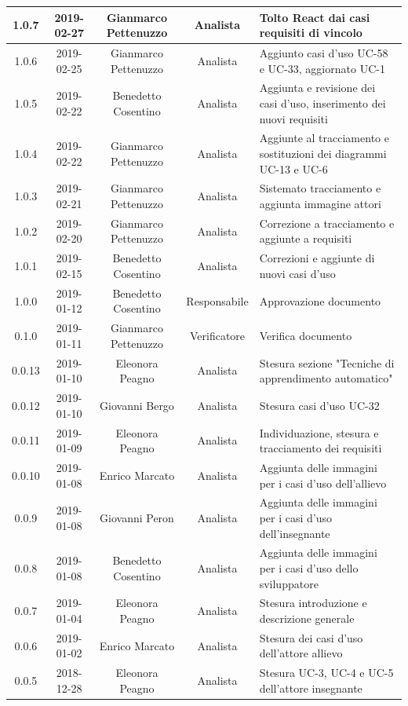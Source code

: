 \documentclass[11pt,a4paper]{article}
\begin{document}
{\begin{tabularx}{\textwidth}{ c | c | c | c | X }
		1.0.7 & 2019-02-27 & Gianmarco Pettenuzzo & Analista & Tolto React dai casi requisiti di vincolo\\ \hline
		1.0.6 & 2019-02-25 & Gianmarco Pettenuzzo & Analista & Aggiunto casi d'uso UC-58 e UC-33, aggiornato UC-1\\ \hline
		1.0.5 & 2019-02-22 & Benedetto Cosentino & Analista & Aggiunta e revisione dei casi d'uso, inserimento dei nuovi requisiti\\ \hline
		1.0.4 & 2019-02-22 & Gianmarco Pettenuzzo & Analista & Aggiunte al tracciamento e sostituzioni dei diagrammi UC-13 e UC-6\\ \hline
		1.0.3 & 2019-02-21 & Gianmarco Pettenuzzo & Analista & Sistemato tracciamento e aggiunta immagine attori\\ \hline
		1.0.2 & 2019-02-20 & Gianmarco Pettenuzzo & Analista & Correzione a tracciamento e aggiunte a requisiti\\ \hline
		1.0.1 & 2019-02-15 & Benedetto Cosentino & Analista & Correzioni e aggiunte di nuovi casi d'uso \\ \hline
		1.0.0 & 2019-01-12 & Benedetto Cosentino & Responsabile & Approvazione documento \\ \hline
		0.1.0 & 2019-01-11 & Gianmarco Pettenuzzo & Verificatore & Verifica documento \\ \hline
		0.0.13 & 2019-01-10 & Eleonora Peagno & Analista & Stesura sezione "Tecniche di apprendimento automatico" \\ \hline
		0.0.12 & 2019-01-10 & Giovanni Bergo & Analista & Stesura casi d'uso UC-32 \\ \hline
		0.0.11 & 2019-01-09 & Eleonora Peagno & Analista & Individuazione, stesura e tracciamento dei requisiti \\ \hline
		0.0.10 & 2019-01-08 & Enrico Marcato & Analista & Aggiunta delle immagini per i casi d'uso dell'allievo\\ \hline
		0.0.9 & 2019-01-08 & Giovanni Peron & Analista & Aggiunta delle immagini per i casi d'uso dell'insegnante\\ \hline
		0.0.8 & 2019-01-08 & Benedetto Cosentino & Analista & Aggiunta delle immagini per i casi d'uso dello sviluppatore\\ \hline
		0.0.7 & 2019-01-04 & Eleonora Peagno & Analista & Stesura introduzione e descrizione generale\\ \hline
		0.0.6 & 2019-01-02 & Enrico Marcato & Analista & Stesura dei casi d'uso dell'attore allievo\\ \hline
		0.0.5 & 2018-12-28 & Eleonora Peagno & Analista & Stesura UC-3, UC-4 e UC-5 dell'attore insegnante\\ \hline

\end{tabularx}}
\end{document}
